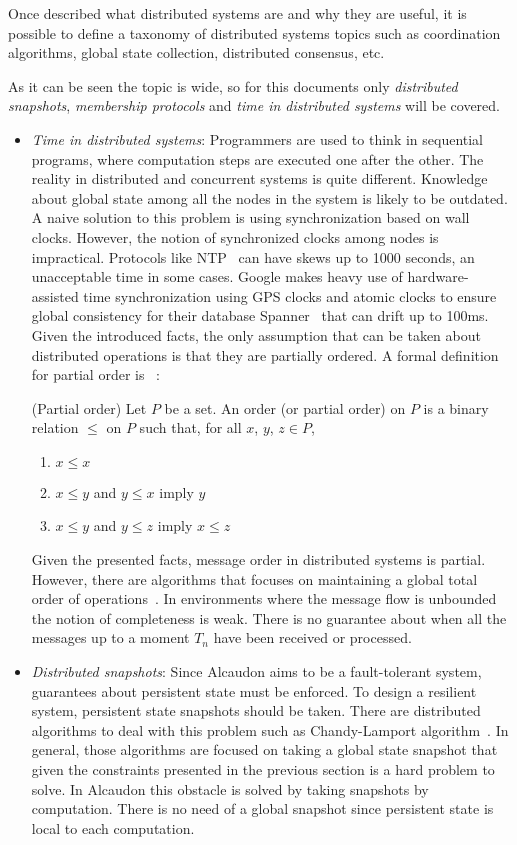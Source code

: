 Once described what distributed systems are and why they are useful, it is
possible to define a taxonomy of distributed systems topics such as coordination
algorithms, global state collection, distributed consensus, etc.

As it can be seen the topic is wide, so for this documents only
\textit{distributed snapshots}, \textit{membership protocols} and \textit{time
  in distributed systems} will be covered.

\begin{itemize}
\item \textit{Time in distributed systems}:
  Programmers are used to think in sequential programs, where computation steps
  are executed one after the other. The reality in distributed and concurrent
  systems is quite different. Knowledge about global state among all the nodes
  in the system is likely to be outdated. A naive solution to this problem is
  using synchronization based on wall clocks. However, the notion of
  synchronized clocks among nodes is impractical. Protocols like \ac{NTP}~\cite{ntp}
  can have skews up to 1000 seconds, an unacceptable time in some cases. Google
  makes heavy use of hardware-assisted time synchronization using GPS clocks and
  atomic clocks to ensure global consistency for their database
  Spanner~\cite{180268} that can drift up to 100ms. Given the introduced facts, the
  only assumption that can be taken about distributed operations is that they are partially
  ordered. A formal definition for partial order is ~\cite{book:lattices}:
  \begin{definition}{(Partial order)}
    Let $P$ be a set. An order (or partial order) on $P$ is a binary relation
    $\leq$ on $P$ such that, for all $x$, $y$, $z \in P$,
    \begin{enumerate}
    \item $x \leq x$
    \item $x \leq y$ and $y \leq x$ imply $y$
    \item $x \leq y$ and $y \leq z$ imply $x \leq z$
    \end{enumerate}
  \end{definition}
  Given the presented facts, message order in distributed systems is partial.
  However, there are algorithms that focuses on maintaining a global total order
  of operations~\cite{vclocks}. In environments where the message flow is unbounded
  the notion of completeness is weak. There is no guarantee about when all the
  messages up to a moment $T_n$ have been received or processed. 
\item \textit{Distributed snapshots}:
  Since Alcaudon aims to be a fault-tolerant system, guarantees about persistent
  state must be enforced. To design a resilient system, persistent state
  snapshots should be taken. There are distributed algorithms to deal with this
  problem such as Chandy-Lamport algorithm~\cite{lampsnapshot}. In general, those algorithms are focused
  on taking a global state snapshot that given the constraints presented in the
  previous section is a hard problem to solve. In Alcaudon this obstacle is
  solved by taking snapshots by computation. There is no need of a global
  snapshot since persistent state is local to each computation.


\end{itemize}
